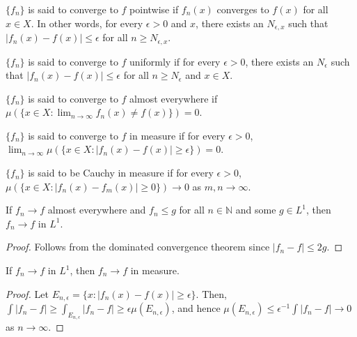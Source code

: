 \documentclass[a4paper,english,12pt]{article}
\begin{document}
\begin{defn} $\{f_n\}$ is said to converge to $f$ pointwise if $f_n(x)$ converges to $f(x)$ for all $x\in X$. In other words, for every $\epsilon>0$ and $x$, there exists an $N_{\epsilon,x}$ such that $|f_n(x)-f(x)|\leqslant\epsilon$ for all $n\geqslant N_{\epsilon,x}$.
\end{defn}

\begin{defn} $\{f_n\}$ is said to converge to $f$ uniformly if for every $\epsilon>0$, there exists an $N_{\epsilon}$ such that $|f_n(x)-f(x)|\leqslant\epsilon$ for all $n\geqslant N_{\epsilon}$ and $x\in X$.
\end{defn}

\begin{defn} $\{f_n\}$ is said to converge to $f$ almost everywhere if $\mu(\{x\in X:\lim_{n\rightarrow\infty}f_n(x)\neq f(x)\})=0$.
\end{defn}

\begin{defn} $\{f_n\}$ is said to converge to $f$ in measure if for every $\epsilon>0$, $\lim_{n\rightarrow\infty}\mu(\{x\in X:|f_n(x)-f(x)|\geqslant\epsilon\})=0$.
\end{defn}

\begin{defn} $\{f_n\}$ is said to be Cauchy in measure if for every $\epsilon >0$, $\mu(\{x\in X:|f_n(x)-f_m(x)|\geqslant 0\})\rightarrow 0$ as $m,n\rightarrow \infty$.
\end{defn}

\begin{thm}If $f_n\rightarrow f$ almost everywhere and $f_n\leqslant g$ for all $n\in \mathbb{N}$ and some $g\in L^1$, then $f_n\rightarrow f$ in $L^1$.
\end{thm}
\begin{proof}Follows from the dominated convergence theorem since $|f_n-f|\leqslant 2g$.
\end{proof}

\begin{prop}If $f_n\rightarrow f$ in $L^1$, then $f_n\rightarrow f$ in measure.
\end{prop}
\begin{proof}Let $E_{n,\epsilon}=\{x:|f_n(x)-f(x)|\geqslant\epsilon\}$. Then, $\int |f_n-f|\geqslant\int_{E_{n,\epsilon}}|f_n-f|\geqslant\epsilon\mu(E_{n,\epsilon})$, and hence $\mu(E_{n,\epsilon})\leqslant\epsilon^{-1}\int|f_n-f|\rightarrow 0$ as $n\rightarrow\infty$.
\end{proof}
\end{document}
